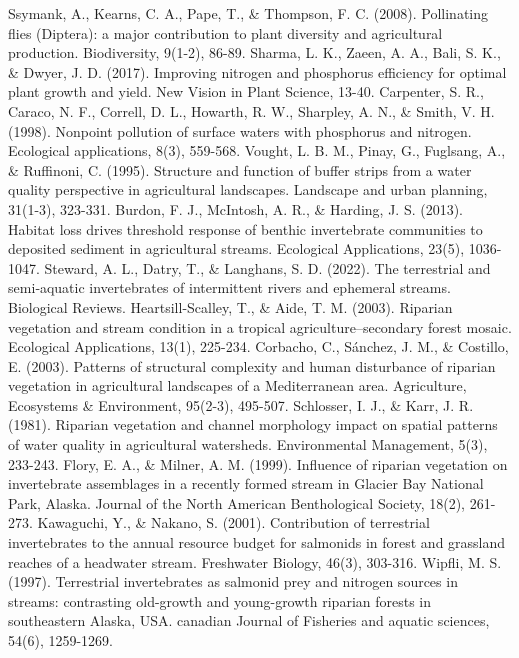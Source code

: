 \documentclass[12pt]{article}
\numberwithin{equation}{section}
\begin{document}
\begin{thebibliography}{99}
  Ssymank, A., Kearns, C. A., Pape, T., \& Thompson, F. C. (2008). Pollinating flies (Diptera): a major contribution to plant diversity and agricultural production. Biodiversity, 9(1-2), 86-89.
   Sharma, L. K., Zaeen, A. A., Bali, S. K., \& Dwyer, J. D. (2017). Improving nitrogen and phosphorus efficiency for optimal plant growth and yield. New Vision in Plant Science, 13-40.
  Carpenter, S. R., Caraco, N. F., Correll, D. L., Howarth, R. W., Sharpley, A. N., \& Smith, V. H. (1998). Nonpoint pollution of surface waters with phosphorus and nitrogen. Ecological applications, 8(3), 559-568.
  Vought, L. B. M., Pinay, G., Fuglsang, A., \& Ruffinoni, C. (1995). Structure and function of buffer strips from a water quality perspective in agricultural landscapes. Landscape and urban planning, 31(1-3), 323-331.
  Burdon, F. J., McIntosh, A. R., \& Harding, J. S. (2013). Habitat loss drives threshold response of benthic invertebrate communities to deposited sediment in agricultural streams. Ecological Applications, 23(5), 1036-1047.
  Steward, A. L., Datry, T., \& Langhans, S. D. (2022). The terrestrial and semi‐aquatic invertebrates of intermittent rivers and ephemeral streams. Biological Reviews.
  Heartsill-Scalley, T., \& Aide, T. M. (2003). Riparian vegetation and stream condition in a tropical agriculture–secondary forest mosaic. Ecological Applications, 13(1), 225-234.
  Corbacho, C., Sánchez, J. M., \& Costillo, E. (2003). Patterns of structural complexity and human disturbance of riparian vegetation in agricultural landscapes of a Mediterranean area. Agriculture, Ecosystems \& Environment, 95(2-3), 495-507.
  Schlosser, I. J., \& Karr, J. R. (1981). Riparian vegetation and channel morphology impact on spatial patterns of water quality in agricultural watersheds. Environmental Management, 5(3), 233-243.
Flory, E. A., \& Milner, A. M. (1999). Influence of riparian vegetation on invertebrate assemblages in a recently formed stream in Glacier Bay National Park, Alaska. Journal of the North American Benthological Society, 18(2), 261-273.
  Kawaguchi, Y., \& Nakano, S. (2001). Contribution of terrestrial invertebrates to the annual resource budget for salmonids in forest and grassland reaches of a headwater stream. Freshwater Biology, 46(3), 303-316.
  Wipfli, M. S. (1997). Terrestrial invertebrates as salmonid prey and nitrogen sources in streams: contrasting old-growth and young-growth riparian forests in southeastern Alaska, USA. canadian Journal of Fisheries and aquatic sciences, 54(6), 1259-1269.

\end{thebibliography}
\end{document}
